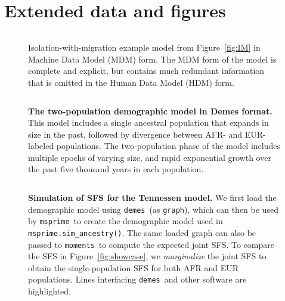 \documentclass[11pt]{article}
\newcommand{\msprime}[0]{\texttt{msprime}}
\newcommand{\demes}[0]{\texttt{demes}}
\newcommand{\moments}[0]{\texttt{moments}}
\begin{document}
\section{Extended data and figures}
\label{sec:appendix-figures}

\begin{figure}[h!]
    \begin{tcolorbox}
        \inputminted[fontsize=\scriptsize,numbersep=5pt]{yaml}{models/IM-resolved.yaml}
    \end{tcolorbox}
    \caption{
        \label{fig:IM-MDM}
        Isolation-with-migration example model from Figure~\ref{fig:IM}
        in Machine Data Model (MDM) form.
        The MDM form of the model is complete and explicit, but contains
        much redundant information that is omitted in the Human Data Model
        (HDM) form.
    }
\end{figure}

\begin{figure}[h!]
    \begin{tcolorbox}
        \inputminted[fontsize=\scriptsize,numbersep=5pt]{yaml}{models/tennessen.yaml}
    \end{tcolorbox}
    \caption{
        \textbf{The \citet{tennessen2012evolution} two-population
        demographic model in Demes format.}
        This model includes a single ancestral population that expands in
        size in the past, followed by divergence between AFR- and EUR-labeled
        populations. The two-population phase of the model includes multiple
        epochs of varying size, and rapid exponential growth over the past
        five thousand years in each population.
    }
    \label{fig:tennessen}
\end{figure}

\begin{figure}[h!]
    \begin{tcolorbox}
        \inputminted[fontsize=\scriptsize,numbersep=5pt,highlightlines={9,19,52}]{python}{models/tennessen-simulation.py}
    \end{tcolorbox}
    \caption{
        \textbf{Simulation of SFS for the Tennessen model.}
        We first load the demographic model using \demes\ (as \texttt{graph}),
        which can then be used by \msprime\ to create the demographic model used in
        \texttt{msprime.sim\_ancestry()}. The same loaded graph can also be
        passed to \moments\ to compute the expected joint SFS.
        To compare the SFS in Figure~\ref{fig:showcase}, we \emph{marginalize} the
        joint SFS to obtain the single-population SFS for both AFR and EUR populations.
        Lines interfacing \demes\ and other software are highlighted.
    }
    \label{fig:tennessen-simulation}
\end{figure}
\end{document}
